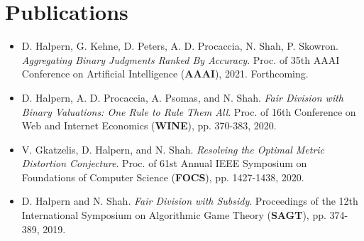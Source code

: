 \documentclass{article}
\begin{document}
    \section{Publications}
    \begin{itemize}
        \setlength\itemsep{1.3ex}
        \item D. Halpern, G. Kehne, D. Peters, A. D. Procaccia, N. Shah, P. Skowron. \textit{Aggregating Binary Judgments Ranked By Accuracy}.
        Proc. of 35th AAAI Conference on Artificial Intelligence (\textbf{AAAI}), 2021. Forthcoming.

        \item D. Halpern, A. D. Procaccia, A. Psomas, and N. Shah. \textit{Fair Division with Binary Valuations: One
        Rule to Rule
        Them All}. Proc. of 16th Conference on Web and Internet Economics (\textbf{WINE}), pp. 370-383, 2020.
        
        \item V. Gkatzelis, D. Halpern, and N. Shah. \textit{Resolving the Optimal Metric Distortion Conjecture}.
        Proc. of 61st Annual IEEE Symposium on Foundations of Computer Science (\textbf{FOCS}), pp. 1427-1438, 2020.

        \item D. Halpern and N. Shah. \textit{Fair Division with Subsidy}. Proceedings of the 12th International Symposium on
        Algorithmic Game Theory (\textbf{SAGT}), pp. 374-389, 2019.

    \end{itemize}
\end{document}
